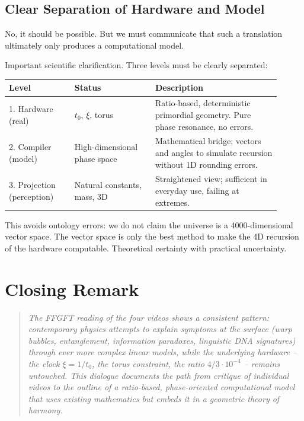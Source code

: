 \subsection{Clear Separation of Hardware and Model}

\begin{userbox}
No, it should be possible. But we must communicate that such a translation ultimately only produces a computational model.
\end{userbox}

\begin{geminibox}
Important scientific clarification. Three levels must be clearly separated:

\begin{center}
\begin{tabular}{p{0.22\linewidth} p{0.27\linewidth} p{0.42\linewidth}}
\hline
\textbf{Level} & \textbf{Status} & \textbf{Description} \\
\hline
1. Hardware (real) & $t_0$, $\xi$, torus & Ratio-based, deterministic primordial geometry. Pure phase resonance, no errors. \\
2. Compiler (model) & High-dimensional phase space & Mathematical bridge; vectors and angles to simulate recursion without 1D rounding errors. \\
3. Projection (perception) & Natural constants, mass, 3D & Straightened view; sufficient in everyday use, failing at extremes. \\
\hline
\end{tabular}
\end{center}

This avoids ontology errors: we do not claim the universe is a 4000-dimensional vector space. The vector space is only the best method to make the 4D recursion of the hardware computable. Theoretical certainty with practical uncertainty.
\end{geminibox}

\section*{Closing Remark}

\begin{quote}
\itshape
The FFGFT reading of the four videos shows a consistent pattern: contemporary physics attempts to explain symptoms at the surface (warp bubbles, entanglement, information paradoxes, linguistic DNA signatures) through ever more complex linear models, while the underlying hardware -- the clock $\xi = 1/t_0$, the torus constraint, the ratio $4/3 \cdot 10^{-4}$ -- remains untouched. This dialogue documents the path from critique of individual videos to the outline of a ratio-based, phase-oriented computational model that uses existing mathematics but embeds it in a geometric theory of harmony.
\end{quote}
